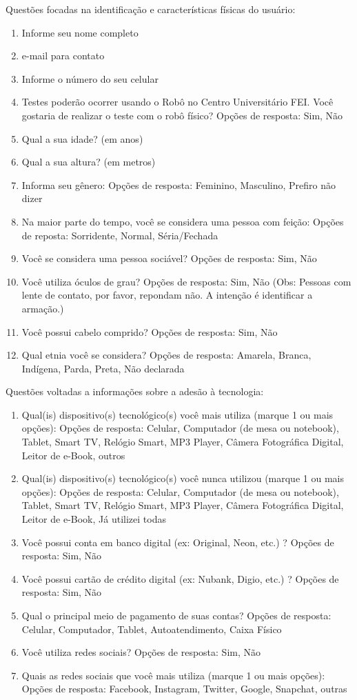 Questões focadas na identificação e características físicas do usuário:

\begin{enumerate}
	\item Informe seu nome completo
	\item e-mail para contato
	\item Informe o número do seu celular
	\item Testes poderão ocorrer usando o Robô no Centro Universitário FEI. Você gostaria de realizar o teste com o robô físico? Opções de resposta: Sim, Não
	\item Qual a sua idade? (em anos)
	\item Qual a sua altura? (em metros)
	\item Informa seu gênero: Opções de resposta: Feminino, Masculino, Prefiro não dizer
	\item Na maior parte do tempo, você se considera uma pessoa com feição: Opções de reposta: Sorridente, Normal, Séria/Fechada
	\item Você se considera uma pessoa sociável? Opções de resposta: Sim, Não
	\item Você utiliza óculos de grau? Opções de resposta: Sim, Não (Obs: Pessoas com lente de contato, por favor, repondam não. A intenção é identificar a armação.)
	\item Você possui cabelo comprido? Opções de resposta: Sim, Não
	\item Qual etnia você se considera? Opções de resposta: Amarela, Branca, Indígena, Parda, Preta, Não declarada
\end{enumerate}

Questões voltadas a informações sobre a adesão à tecnologia:

\begin{enumerate}
	\item Qual(is) dispositivo(s) tecnológico(s) você mais utiliza (marque 1 ou mais opções): Opções de resposta: Celular, Computador (de mesa ou notebook), Tablet, Smart TV, Relógio Smart, MP3 Player, Câmera Fotográfica Digital, Leitor de e-Book, outros
	\item Qual(is) dispositivo(s) tecnológico(s) você nunca utilizou (marque 1 ou mais opções): Opções de resposta: Celular, Computador (de mesa ou notebook), Tablet, Smart TV, Relógio Smart, MP3 Player, Câmera Fotográfica Digital, Leitor de e-Book, Já utilizei todas
	\item Você possui conta em banco digital (ex: Original, Neon, etc.) ? Opções de resposta: Sim, Não
	\item Você possui cartão de crédito digital (ex: Nubank, Digio, etc.) ? Opções de resposta: Sim, Não
	\item Qual o principal meio de pagamento de suas contas? Opções de resposta: Celular, Computador, Tablet, Autoatendimento, Caixa Físico
	\item Você utiliza redes sociais? Opções de resposta: Sim, Não
	\item Quais as redes sociais que você mais utiliza (marque 1 ou mais opções): Opções de resposta: Facebook, Instagram, Twitter, Google\+, Snapchat, outras
\end{enumerate}

